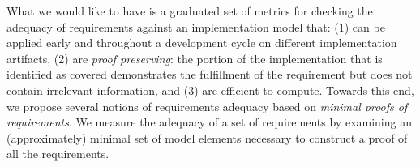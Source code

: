 What we would like to have is a graduated set of metrics for checking the adequacy of requirements against an implementation model that:
    (1) can be applied early and throughout a development cycle on different implementation artifacts,
    (2) are {\em proof preserving}: the portion of the implementation that is identified as covered demonstrates the
        fulfillment of the requirement but does not contain irrelevant information, and
    (3) are efficient to compute.
%
Towards this end, we propose several notions of requirements adequacy based on {\em minimal proofs of requirements}.  We measure the adequacy of a set of requirements by examining an (approximately) minimal set of model elements necessary to construct a proof of all the requirements.


